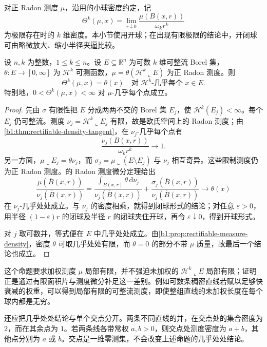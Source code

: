 \ProseParagraphBreak

对正 Radon 测度 \(\mu\)，沿用的小球密度约定，记
\[
 \Theta^k(\mu,x)=\lim_{r\downarrow0}
             \frac{\mu(B(x,r))}{\omega_kr^k}
\]
为极限存在时的 \(k\) 维密度。本小节使用开球；在出现有限极限的结论中，开闭球可由略微放大、缩小半径夹逼比较。

\begin{proposition}\label{b1:prop:rectifiable-weight-density}
设 \(n,k\) 为整数，\(1\leq k\leq n\)。设 \(E\subseteq\mathbb R^n\) 为可数 \(k\) 维可整流 Borel 集，\(\theta:E\to[0,\infty]\) 为 \(\mathcal H^k\) 可测函数，\(\mu=\theta(\mathcal H^k\llcorner E)\) 为正 Radon 测度。则
\[
 \Theta^k(\mu,x)=\theta(x)
 \quad\text{对 }\mathcal H^k\text{-几乎每个 }x\in E.
\]
特别地，\(0<\Theta^k(\mu,x)<\infty\) 对 \(\mu\)-几乎每个点成立。
\end{proposition}
\begin{proof}
先由 \(\sigma\) 有限性把 \(E\) 分成两两不交的 Borel 集 \(E_j\)，使 \(\mathcal H^k(E_j)<\infty\)。每个 \(E_j\) 仍可整流。测度 \(\nu_j=\mathcal H^k\llcorner E_j\) 有限，故是欧氏空间上的 Radon 测度；由\cref{b1:thm:rectifiable-density-tangent}，在 \(\nu_j\)-几乎每个点有
\[
 \frac{\nu_j(B(x,r))}{\omega_kr^k}\longrightarrow1.
\]
另一方面，\(\mu\llcorner E_j=\theta\nu_j\)，而 \(\sigma_j=\mu\llcorner(E\setminus E_j)\) 与 \(\nu_j\) 相互奇异。这些限制测度仍为正 Radon 测度。的 Radon 测度微分定理给出
\[
 \frac{\mu(\overline B(x,r))}{\nu_j(\overline B(x,r))}
 =\frac{\int_{\overline B(x,r)}\theta\,\mathrm d\nu_j}
        {\nu_j(\overline B(x,r))}
  +\frac{\sigma_j(\overline B(x,r))}{\nu_j(\overline B(x,r))}
 \longrightarrow\theta(x)
\]
在 \(\nu_j\)-几乎处处成立。与 \(\nu_j\) 的密度相乘，就得到闭球形式的结论；对任意 \(\varepsilon>0\)，用半径 \((1-\varepsilon)r\) 的闭球及半径 \(r\) 的闭球夹住开球，再令 \(\varepsilon\downarrow0\)，得到开球形式。

对 \(j\) 取可数并，等式便在 \(E\) 中几乎处处成立。由\cref{b1:prop:rectifiable-measure-density}，密度 \(\theta\) 可取几乎处处有限，而 \(\theta=0\) 的部分不带 \(\mu\) 质量，故最后一个结论也成立。
\end{proof}

这个命题要求加权测度 \(\mu\) 局部有限，并不强迫未加权的 \(\mathcal H^k\llcorner E\) 局部有限；证明正是通过有限面积片与测度微分补足这一差别。例如可数条稠密直线若赋以足够快衰减的权重，可以得到局部有限的可整流测度，即使整组直线的未加权长度在每个球内都是无穷。

\ProseParagraphBreak

还应把几乎处处结论与单个交点分开。两条不同直线的并，在交点处的集合密度为 \(2\)，而在其余点为 \(1\)。若两条线各带常权 \(a,b>0\)，则交点处测度密度为 \(a+b\)，其他点分别为 \(a\) 或 \(b\)。交点是一维零测集，不会改变上述命题的几乎处处结论。
